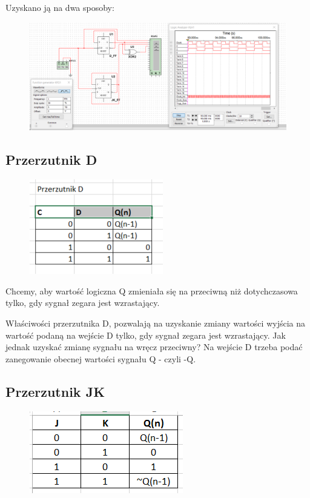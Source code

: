 \documentclass[12pt,a4paper]{article}
\begin{document}
Uzyskano ją na dwa sposoby:

\begin{figure}[H]
\centering
\includegraphics[width=\textwidth]{img/4a}
\end{figure}

\subsection{Przerzutnik D}
\begin{figure}[H]
\centering
\includegraphics{img/4a_table_d}
\end{figure}
Chcemy, aby wartość logiczna Q zmieniała się na przeciwną niż dotychczasowa tylko, gdy sygnał zegara jest wzrastający.

Właściwości przerzutnika D, pozwalają na uzyskanie zmiany wartości wyjścia na wartość podaną na wejście D tylko, gdy sygnał zegara jest wzrastający. Jak jednak uzyskać zmianę sygnału na wręcz przeciwny? 
Na wejście D trzeba podać zanegowanie obecnej wartości sygnału Q - czyli -Q.

\subsection{Przerzutnik JK}

\begin{figure}[H]
\centering
\includegraphics{img/4a_table_jk}
\end{figure}
\end{document}
